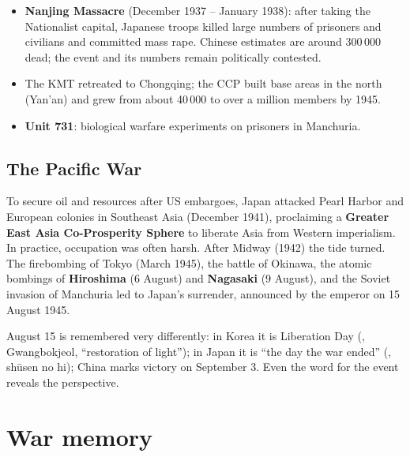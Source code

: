 \begin{itemize}
  \item \textbf{Nanjing Massacre} (December 1937 -- January 1938): after taking the
        Nationalist capital, Japanese troops killed large numbers of prisoners and civilians
        and committed mass rape. Chinese estimates are around 300\,000 dead; the event and its
        numbers remain politically contested.
  \item The KMT retreated to Chongqing; the CCP built base areas in the north (Yan'an) and
        grew from about 40\,000 to over a million members by 1945.
  \item \textbf{Unit 731}: biological warfare experiments on prisoners in Manchuria.
\end{itemize}

\subsection{The Pacific War}

To secure oil and resources after US embargoes, Japan attacked Pearl Harbor and European
colonies in Southeast Asia (December 1941), proclaiming a \textbf{Greater East Asia
Co-Prosperity Sphere} to liberate Asia from Western imperialism. In practice, occupation
was often harsh. After Midway (1942) the tide turned. The firebombing of Tokyo (March
1945), the battle of Okinawa, the atomic bombings of \textbf{Hiroshima} (6 August) and
\textbf{Nagasaki} (9 August), and the Soviet invasion of Manchuria led to Japan's surrender,
announced by the emperor on 15 August 1945.

\begin{aside}
August 15 is remembered very differently: in Korea it is Liberation Day
(, Gwangbokjeol, ``restoration of light''); in Japan it is ``the day the war
ended'' (, shūsen no hi); China marks victory on September 3. Even the word
for the event reveals the perspective.
\end{aside}

\section{War memory}

